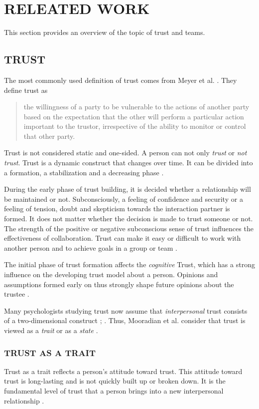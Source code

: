 \documentclass[sigchi]{acmart}
\begin{document}
\section{RELEATED WORK}
This section provides an overview of the topic of trust and teams.
\subsection{TRUST}
The most commonly used definition of trust comes from Meyer et al. \citep[p. 712]{mayer1995integrative}. They define trust as
\begin{quote} \grqq{}the willingness of a party to be vulnerable to the actions of another party based on the expectation that the other will perform a particular action important to the trustor, irrespective of the ability to monitor or control that other party.\grqq{} \end{quote}

Trust is not considered static and one-sided. A person can not only \textit{trust} or \textit{not trust}. Trust is a dynamic construct that changes over time. It can be divided into a formation, a stabilization and a decreasing phase \citep[p. 396]{rousseau1998not}.

During the early phase of trust building, it is decided whether a relationship will be maintained or not. Subconsciously, a feeling of confidence and security or a feeling of tension, doubt and skepticism towards the interaction partner is formed.
It does not matter whether the decision is made to trust someone or not. The strength of the positive or negative subconscious sense of trust influences the effectiveness of collaboration. Trust can make it easy or difficult to work with another person and to achieve goals in a group or team \citep[p. 405-406]{bigley1998straining}.

The initial phase of trust formation affects the \textit{cognitive} Trust, which has a strong influence on the developing trust model about a person.
Opinions and assumptions formed early on thus strongly shape future opinions about the trustee \citep[pp. 461-462]{baldwin1992relational}.

Many psychologists studying trust now assume that \textit{interpersonal} trust consists of a two-dimensional construct \citep{johnson2005cognitive}; \citep{cook1980new}. Thus, Mooradian et al. consider that trust is viewed as a \textit{trait} or as a \textit{state} \citep[pp. 524-525]{mooradian2006trusts}.

\subsubsection{TRUST AS A TRAIT}
Trust as a trait reflects a person's attitude toward trust. This attitude toward trust is long-lasting and is not quickly built up or broken down. It is the fundamental level of trust that a person brings into a new interpersonal relationship \citep[p. 11]{couch1996assessment}. 
\end{document}
